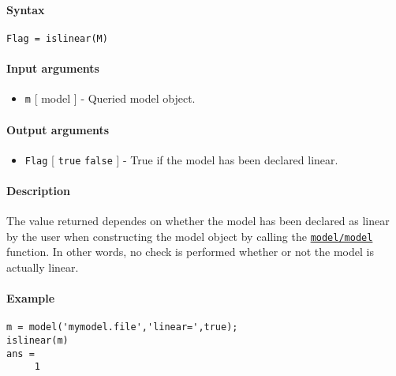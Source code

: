 


	\paragraph{Syntax}\label{syntax}

\begin{verbatim}
Flag = islinear(M)
\end{verbatim}

\paragraph{Input arguments}\label{input-arguments}

\begin{itemize}
\itemsep1pt\parskip0pt
\item
  \texttt{m} {[} model {]} - Queried model object.
\end{itemize}

\paragraph{Output arguments}\label{output-arguments}

\begin{itemize}
\itemsep1pt\parskip0pt
\item
  \texttt{Flag} {[} \texttt{true} \textbar{} \texttt{false} {]} - True
  if the model has been declared linear.
\end{itemize}

\paragraph{Description}\label{description}

The value returned dependes on whether the model has been declared as
linear by the user when constructing the model object by calling the
\href{model/model}{\texttt{model/model}} function. In other words, no
check is performed whether or not the model is actually linear.

\paragraph{Example}\label{example}

\begin{verbatim}
m = model('mymodel.file','linear=',true);
islinear(m)
ans =
     1
\end{verbatim}


